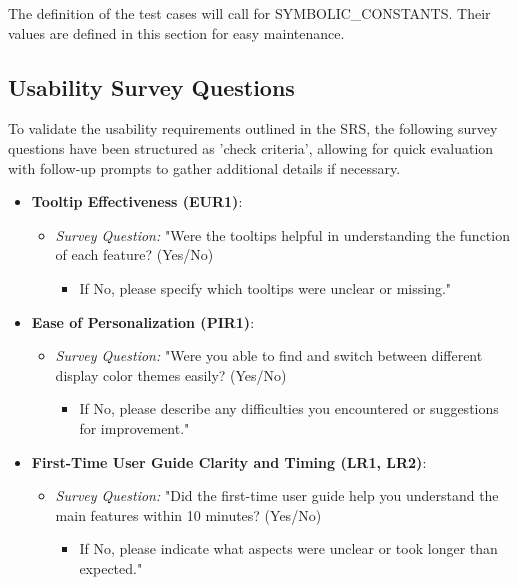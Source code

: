 \documentclass[12pt, titlepage]{article}
\begin{document}
The definition of the test cases will call for SYMBOLIC\_CONSTANTS.
Their values are defined in this section for easy maintenance.

\subsection{Usability Survey Questions}

To validate the usability requirements outlined in the SRS, the following survey questions have been structured as 'check criteria', 
allowing for quick evaluation with follow-up prompts to gather additional details if necessary.

\begin{itemize}
    \item \textbf{Tooltip Effectiveness (EUR1)}:
    \begin{itemize}
        \item \textit{Survey Question:} "Were the tooltips helpful in understanding the function of each feature? (Yes/No)  
        \begin{itemize}
            \item If No, please specify which tooltips were unclear or missing."
        \end{itemize}
    \end{itemize}

    \item \textbf{Ease of Personalization (PIR1)}:
    \begin{itemize}
        \item \textit{Survey Question:} "Were you able to find and switch between different display color themes easily? (Yes/No)  
        \begin{itemize}
            \item If No, please describe any difficulties you encountered or suggestions for improvement."
        \end{itemize}
    \end{itemize}

    \item \textbf{First-Time User Guide Clarity and Timing (LR1, LR2)}:
    \begin{itemize}
        \item \textit{Survey Question:} "Did the first-time user guide help you understand the main features within 10 minutes? (Yes/No)  
        \begin{itemize}
            \item If No, please indicate what aspects were unclear or took longer than expected."
        \end{itemize}
    \end{itemize}


\end{itemize}
\end{document}

